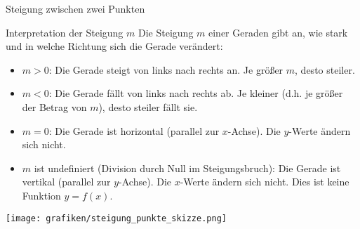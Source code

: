 \begin{loesungsumgebung}{Steigung zwischen zwei Punkten}
\begin{merksatzumgebung}{Interpretation der Steigung $m$}
Die Steigung $m$ einer Geraden gibt an, wie stark und in welche Richtung sich die Gerade verändert:
\begin{itemize}
    \item $m > 0$: Die Gerade steigt von links nach rechts an. Je größer $m$, desto steiler.
    \item $m < 0$: Die Gerade fällt von links nach rechts ab. Je kleiner (d.h. je größer der Betrag von $m$), desto steiler fällt sie.
    \item $m = 0$: Die Gerade ist horizontal (parallel zur $x$-Achse). Die $y$-Werte ändern sich nicht.
    \item $m$ ist undefiniert (Division durch Null im Steigungsbruch): Die Gerade ist vertikal (parallel zur $y$-Achse). Die $x$-Werte ändern sich nicht. Dies ist keine Funktion $y=f(x)$.
\end{itemize}
\end{merksatzumgebung}

\begin{center}
\texttt{[image: grafiken/steigung\_punkte\_skizze.png]}
\label{fig:steigung_skizzen}
\end{center}

\end{loesungsumgebung}



